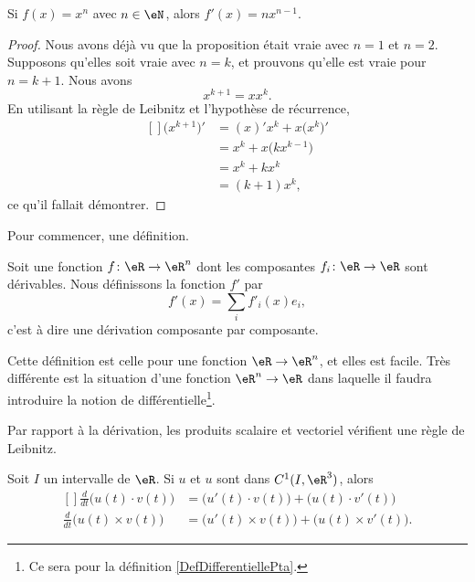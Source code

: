 \begin{proposition}
	Si $f(x)=x^n$ avec $n\in\eN$, alors $f'(x)=nx^{n-1}$.
\end{proposition}
\begin{proof}
	Nous avons déjà vu que la proposition était vraie avec $n=1$ et $n=2$. Supposons qu'elles soit vraie avec $n=k$, et prouvons qu'elle est vraie pour $n=k+1$. Nous avons
	\begin{equation}
		x^{k+1}=xx^k.
	\end{equation}
	En utilisant la règle de Leibnitz et l'hypothèse de récurrence,
	\begin{equation}
		\begin{aligned}[]
			\big( x^{k+1} \big)'&=(x)'x^k+x\big( x^k \big)'\\
			&=x^k+x\big( kx^{k-1} \big)\\
			&=x^k+kx^k\\
			&=(k+1)x^k,
		\end{aligned}
	\end{equation}
	ce qu'il fallait démontrer.
\end{proof}

Pour commencer, une définition.
\begin{definition}
    Soit une fonction \( f\colon \eR\to \eR^n\) dont les composantes \( f_i\colon \eR\to \eR\) sont dérivables. Nous définissons la fonction \( f'\) par
    \begin{equation}
        f'(x)=\sum_if'_i(x)e_i,
    \end{equation}
    c'est à dire une dérivation composante par composante.
\end{definition}

Cette définition est celle pour une fonction \( \eR\to \eR^n\), et elles est facile. Très différente est la situation d'une fonction \( \eR^n\to \eR\) dans laquelle il faudra introduire la notion de différentielle\footnote{Ce sera pour la définition \ref{DefDifferentiellePta}.}.

Par rapport à la dérivation, les produits scalaire et vectoriel vérifient une règle de Leibnitz. 
\begin{proposition}     \label{PROPooFKKHooQZGXhE}
    Soit $I$ un intervalle de $\eR$. Si $u$ et $u$ sont dans $C^1(I,\eR^3)$, alors
    \begin{equation}		\label{EqFormLeibProdscalVect}
        \begin{aligned}[]
            \frac{ d }{ dt }\big( u(t)\cdot v(t) \big)&=\big( u'(t)\cdot v(t) \big)+\big( u(t)\cdot v'(t) \big)\\
            \frac{ d }{ dt }\big( u(t)\times v(t) \big)&=\big( u'(t)\times v(t) \big)+\big( u(t)\times v'(t) \big).
        \end{aligned}
    \end{equation}
\end{proposition}

